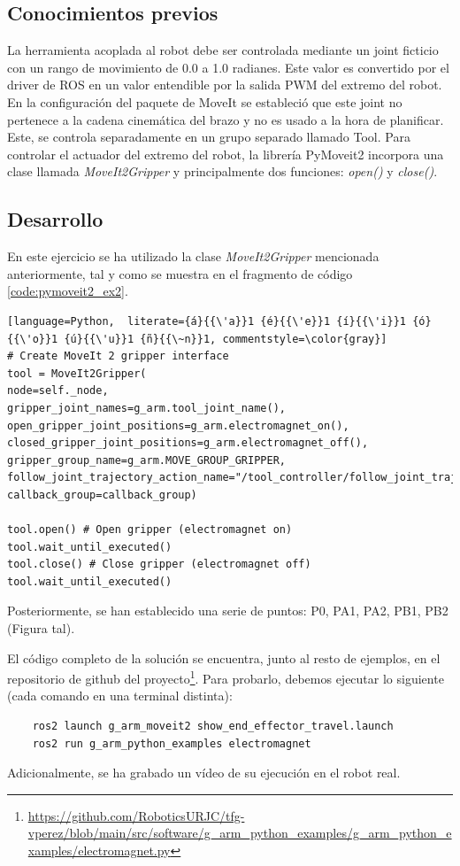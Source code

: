 \subsection*{Conocimientos previos}
\noindent La herramienta acoplada al robot debe ser controlada mediante un joint ficticio con un rango de movimiento de 0.0 a 1.0 radianes. Este 
valor es convertido por el driver de ROS en un valor entendible por la salida PWM del extremo del robot. En la configuración del paquete de MoveIt se 
estableció que este joint no pertenece a la cadena cinemática del brazo y no es usado a la hora de planificar. Este, se controla separadamente 
en un grupo separado llamado Tool. Para controlar el actuador del extremo del robot, la librería PyMoveit2 incorpora una clase llamada \textit{MoveIt2Gripper} y principalmente dos 
funciones: \textit{open()} y \textit{close()}.

\subsection*{Desarrollo}
\noindent En este ejercicio se ha utilizado la clase \textit{MoveIt2Gripper} mencionada anteriormente, tal y como 
se muestra en el fragmento de código \ref{code:pymoveit2_ex2}.
\begin{code}[ht!]
\begin{lstlisting}[language=Python,  literate={á}{{\'a}}1 {é}{{\'e}}1 {í}{{\'i}}1 {ó}{{\'o}}1 {ú}{{\'u}}1 {ñ}{{\~n}}1, commentstyle=\color{gray}]
# Create MoveIt 2 gripper interface
tool = MoveIt2Gripper(
node=self._node,
gripper_joint_names=g_arm.tool_joint_name(),
open_gripper_joint_positions=g_arm.electromagnet_on(),
closed_gripper_joint_positions=g_arm.electromagnet_off(),
gripper_group_name=g_arm.MOVE_GROUP_GRIPPER,
follow_joint_trajectory_action_name="/tool_controller/follow_joint_trajectory",
callback_group=callback_group)

tool.open() # Open gripper (electromagnet on)
tool.wait_until_executed()
tool.close() # Close gripper (electromagnet off)
tool.wait_until_executed()
\end{lstlisting}
\caption{Uso básico de PyMoveIt2 para moverse a un punto}
\label{code:pymoveit2_ex2}
\end{code}

Posteriormente, se han establecido una serie de puntos: P0, PA1, PA2, PB1, PB2 (Figura tal).

El código completo de la solución se encuentra, junto al resto de ejemplos, en el repositorio de github del 
proyecto\footnote{\url{https://github.com/RoboticsURJC/tfg-vperez/blob/main/src/software/g\_arm\_python_examples/g\_arm_python\_examples/electromagnet.py}}. Para 
probarlo, debemos ejecutar lo siguiente (cada comando en una terminal distinta):
\begin{verbatim}
    ros2 launch g_arm_moveit2 show_end_effector_travel.launch 
    ros2 run g_arm_python_examples electromagnet
\end{verbatim}
Adicionalmente, se ha grabado un vídeo de su ejecución en el robot real.